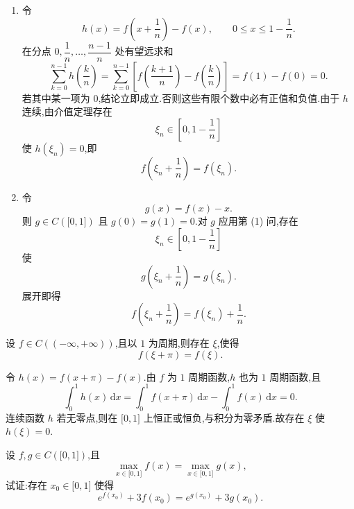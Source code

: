 \begin{solution}
    \leavevmode
    \begin{enumerate}
        \item 令
              \[
                  h(x)=f\left(x+\dfrac{1}{n}\right)-f(x),
                  \qquad
                  0\leq x\leq1-\dfrac{1}{n}.
              \]
              在分点 $0,\dfrac{1}{n},\ldots,\dfrac{n-1}{n}$ 处有望远求和
              \[
                  \sum\limits_{k=0}^{n-1}h\left(\dfrac{k}{n}\right)
                  =\sum\limits_{k=0}^{n-1}
                  \left[
                      f\left(\dfrac{k+1}{n}\right)
                      -f\left(\dfrac{k}{n}\right)
                  \right]
                  =f(1)-f(0)=0.
              \]
              若其中某一项为 $0$,结论立即成立.否则这些有限个数中必有正值和负值.由于 $h$ 连续,由介值定理存在
              \[
                  \xi_n\in\left[0,1-\dfrac{1}{n}\right]
              \]
              使 $h(\xi_n)=0$,即
              \[
                  f\left(\xi_n+\dfrac{1}{n}\right)=f(\xi_n).
              \]

        \item 令
              \[
                  g(x)=f(x)-x.
              \]
              则 $g\in C(\lbrack0,1\rbrack)$ 且 $g(0)=g(1)=0$.对 $g$ 应用第 (1) 问,存在
              \[
                  \xi_n\in\left[0,1-\dfrac{1}{n}\right]
              \]
              使
              \[
                  g\left(\xi_n+\dfrac{1}{n}\right)=g(\xi_n).
              \]
              展开即得
              \[
                  f\left(\xi_n+\dfrac{1}{n}\right)
                  =f(\xi_n)+\dfrac{1}{n}.
              \]
    \end{enumerate}
\end{solution}

\begin{example}
    设 $f\in C(( -\infty,+\infty))$,且以 $1$ 为周期,则存在 $\xi$,使得
    \[
        f(\xi+\pi)=f(\xi).
    \]
\end{example}
\exampleblank

\begin{solution}
    令 $h(x)=f(x+\pi)-f(x)$.由 $f$ 为 $1$ 周期函数,$h$ 也为 $1$ 周期函数,且
    \[
        \displaystyle\int_0^1h(x)\,\mathrm{d}x
        =\int_0^1f(x+\pi)\,\mathrm{d}x-\int_0^1f(x)\,\mathrm{d}x=0.
    \]
    连续函数 $h$ 若无零点,则在 $\lbrack0,1\rbrack$ 上恒正或恒负,与积分为零矛盾.故存在 $\xi$ 使 $h(\xi)=0$.
\end{solution}

\begin{example}
    设 $f,g\in C(\lbrack 0,1\rbrack)$,且
    \[
        \max\limits_{x\in\lbrack 0,1\rbrack}f(x)=\max\limits_{x\in\lbrack 0,1\rbrack}g(x),
    \]
    试证:存在 $x_0\in\lbrack 0,1\rbrack$ 使得
    \[
        e^{f(x_0)}+3f(x_0)=e^{g(x_0)}+3g(x_0).
    \]
\end{example}
\exampleblank

